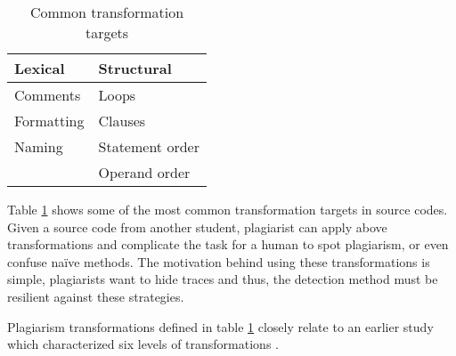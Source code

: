 \begin{table}[ht]
\centering
\caption{Common transformation targets}
\label{tbl-plag-strat}
\begin{tabular}{|l|l|} \hline
 \textbf{Lexical} & \textbf{Structural} \\ \hline
 Comments                    & Loops                          \\
 Formatting                  & Clauses                        \\
 Naming                      & Statement order                \\
                             & Operand order               \\ \hline
\end{tabular}
\end{table}

Table \ref{tbl-plag-strat} shows some of the most common transformation targets in source codes. Given a source code from another student, plagiarist can apply above transformations and complicate the task for a human to spot plagiarism, or even confuse naïve methods. The motivation behind using these transformations is simple, plagiarists want to hide traces and thus, the detection method must be resilient against these strategies.

\newpage

Plagiarism transformations defined in table \ref{tbl-plag-strat} closely relate to an earlier study which characterized six levels of transformations \cite{Faidhi:1987:EAD:27319.27321}.

\begin{table}[ht]
\centering
\caption{Transformation levels}
\label{tbl-plag-transf}
\end{table}

